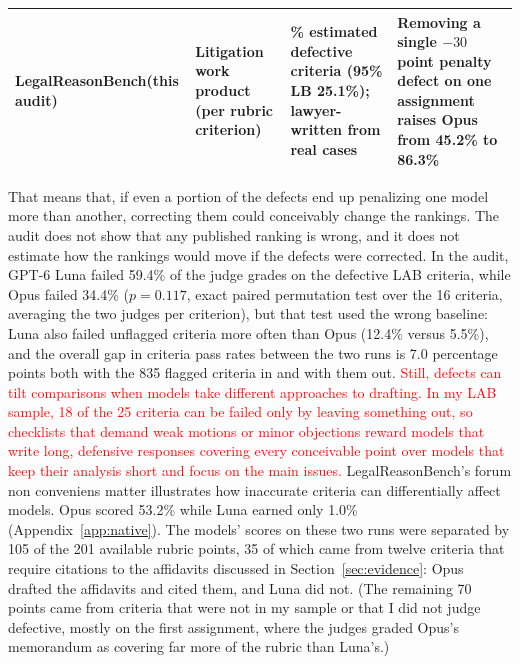 \documentclass[11pt]{article}
\newcommand{\draft}[1]{\textcolor{red}{#1}}
\newcommand{\faintrule}{\arrayrulecolor{black!25}\specialrule{0.3pt}{3pt}{3pt}\arrayrulecolor{black}}
\newcommand{\labFlagged}{835}
\newcommand{\labSample}{25}
\newcommand{\labDefective}{16}
\newcommand{\labLunaDefectiveFailPct}{59.4}
\newcommand{\labOpusDefectiveFailPct}{34.4}
\newcommand{\labPairedP}{0.117}
\newcommand{\labLunaUnflaggedGradeFailPct}{12.4}
\newcommand{\labOpusUnflaggedGradeFailPct}{5.5}
\newcommand{\lrbDefectiveShareLB}{25.1}
\newcommand{\lrbDefectivePointShare}{29.6}
\newcommand{\lrbForumOpusScore}{53.2}
\newcommand{\lrbForumLunaScore}{1.0}
\newcommand{\lrbForumOpusBeforePenalty}{86.3}
\newcommand{\lrbForumOpusAfterPenalty}{45.2}
\begin{document}
\begin{table}[htbp]
\begin{tabular}{@{}>{\raggedright\arraybackslash}p{.22\linewidth}>{\raggedright\arraybackslash}p{.15\linewidth}>{\raggedright\arraybackslash}p{.31\linewidth}>{\raggedright\arraybackslash}p{.26\linewidth}@{}}
\faintrule
\textbf{LegalReasonBench}\newline (this audit) & Litigation work product (per rubric criterion) & \lrbDefectivePointShare\% estimated defective criteria (95\% LB \lrbDefectiveShareLB\%); lawyer-written from real cases & Removing a single $-30$ point penalty defect on one assignment raises Opus from \lrbForumOpusAfterPenalty\% to \lrbForumOpusBeforePenalty\% \\
\bottomrule
\end{tabular}
\end{table}

That means that, if even a portion of the defects end up penalizing one model more than another, correcting them could conceivably change the rankings. The audit does not show that any published ranking is wrong, and it does not estimate how the rankings would move if the defects were corrected. In the audit, GPT-6 Luna failed \labLunaDefectiveFailPct\% of the judge grades on the defective LAB criteria, while Opus failed \labOpusDefectiveFailPct\% ($p = \labPairedP$, exact paired permutation test over the \labDefective{} criteria, averaging the two judges per criterion), but that test used the wrong baseline: Luna also failed unflagged criteria more often than Opus (\labLunaUnflaggedGradeFailPct\% versus \labOpusUnflaggedGradeFailPct\%), and the overall gap in criteria pass rates between the two runs is 7.0 percentage points both with the \labFlagged{} flagged criteria in and with them out. \draft{Still, defects can tilt comparisons when models take different approaches to drafting. In my LAB sample, 18 of the \labSample{} criteria can be failed only by leaving something out, so checklists that demand weak motions or minor objections reward models that write long, defensive responses covering every conceivable point over models that keep their analysis short and focus on the main issues.} LegalReasonBench's forum non conveniens matter illustrates how inaccurate criteria can differentially affect models. Opus scored \lrbForumOpusScore\% while Luna earned only \lrbForumLunaScore\% (Appendix~\ref{app:native}). The models' scores on these two runs were separated by 105 of the 201 available rubric points, 35 of which came from twelve criteria that require citations to the affidavits discussed in Section~\ref{sec:evidence}: Opus drafted the affidavits and cited them, and Luna did not. (The remaining 70 points came from criteria that were not in my sample or that I did not judge defective, mostly on the first assignment, where the judges graded Opus's memorandum as covering far more of the rubric than Luna's.)
\end{document}
